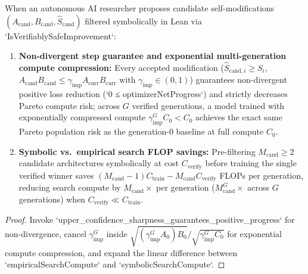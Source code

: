 \begin{lemma}\label{lem:verifiable_self_improvement}
\leanok
{}
When an autonomous AI researcher proposes candidate self-modifications $(A_{\mathrm{cand}}, B_{\mathrm{cand}}, \hat{S}_{\mathrm{cand}})$ filtered symbolically in Lean via `IsVerifiablySafeImprovement`:
\begin{enumerate}
\item \textbf{Non-divergent step guarantee and exponential multi-generation compute compression:} Every accepted modification ($\hat{S}_{\mathrm{cand},i} \ge S_i$, $A_{\mathrm{cand}}B_{\mathrm{cand}} \le \gamma_{\mathrm{imp}}A_{\mathrm{curr}}B_{\mathrm{curr}}$ with $\gamma_{\mathrm{imp}} \in (0,1)$) guarantees non-divergent positive loss reduction (`0 ≤ optimizerNetProgress`) and strictly decreases Pareto compute risk; across $G$ verified generations, a model trained with exponentially compressed compute $\gamma_{\mathrm{imp}}^G C_0 < C_0$ achieves the exact same Pareto population risk as the generation-$0$ baseline at full compute $C_0$.
\item \textbf{Symbolic vs.\ empirical search FLOP savings:} Pre-filtering $M_{\mathrm{cand}} \ge 2$ candidate architectures symbolically at cost $C_{\mathrm{verify}}$ before training the single verified winner saves $(M_{\mathrm{cand}}-1)C_{\mathrm{train}} - M_{\mathrm{cand}}C_{\mathrm{verify}}$ FLOPs per generation, reducing search compute by $M_{\mathrm{cand}}\times$ per generation ($M_{\mathrm{cand}}^G\times$ across $G$ generations) when $C_{\mathrm{verify}} \ll C_{\mathrm{train}}$.
\end{enumerate}
\end{lemma}
\begin{proof}
\leanok
Invoke `upper_confidence_sharpness_guarantees_positive_progress` for non-divergence, cancel $\gamma_{\mathrm{imp}}^G$ inside $\sqrt{(\gamma_{\mathrm{imp}}^G A_0)B_0} / \sqrt{\gamma_{\mathrm{imp}}^G C_0}$ for exponential compute compression, and expand the linear difference between `empiricalSearchCompute` and `symbolicSearchCompute`.
\end{proof}

